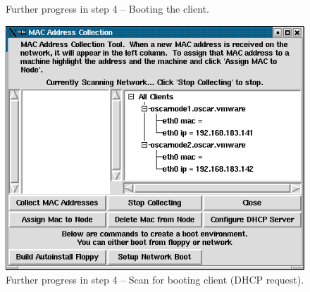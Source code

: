 
\begin{figure}[h!]
  \begin{center}
    \centerline{
      }
    \caption{Further progress in step 4 -- Booting the client.}
    \label{fig:sbs-collect-boot1}
  \end{center}
\end{figure}

\begin{figure}[h!]
  \begin{center}
    \centerline{
      \includegraphics[scale=\imgscale]{figs/6ca_sbs-client-boot1}}
    \caption{Further progress in step 4 -- Scan for booting client (DHCP
      request).}
    \label{fig:sbs-client-boot2}
  \end{center}
\end{figure}

